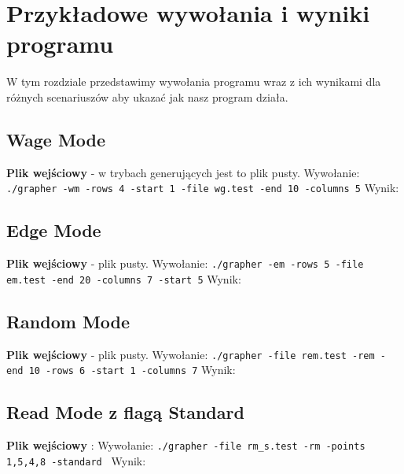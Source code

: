 \documentclass[10pt, a4paper]{report}
\begin{document}
    \newpage
    \section{Przykładowe wywołania i wyniki programu}
    W tym rozdziale przedstawimy wywołania programu wraz z ich wynikami dla różnych scenariuszów aby ukazać jak nasz program działa.

    \subsection{Wage Mode}
    \textbf{Plik wejściowy} - w trybach generujących jest to plik pusty.
    \newline Wywołanie:
    \newline\newline \texttt{./grapher -wm -rows 4 -start 1 -file wg.test -end 10 -columns 5}
    \newline\newline Wynik:

    \subsection{Edge Mode}
    \textbf{Plik wejściowy} - plik pusty.
    \newline Wywołanie:
    \newline\newline \texttt{./grapher -em -rows 5 -file em.test -end 20 -columns 7 -start 5}
    \newline\newline Wynik:    

    \subsection{Random Mode}
    \textbf{Plik wejściowy} - plik pusty.
    \newline Wywołanie:
    \newline\newline \texttt{./grapher -file rem.test -rem -end 10 -rows 6 -start 1 -columns 7}
    \newline\newline Wynik:

    \subsection{Read Mode z flagą Standard}
    \textbf{Plik wejściowy} :
    \newline Wywołanie:
    \newline\newline \texttt{./grapher -file rm\_s.test -rm -points 1,5,4,8 -standard }
    \newline\newline Wynik:
\end{document}
